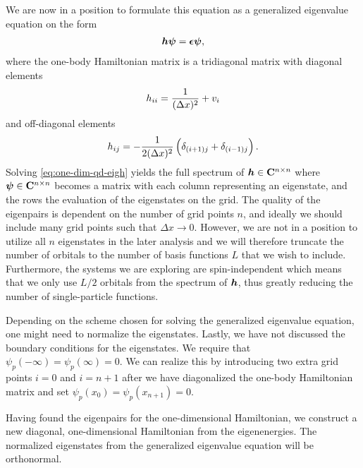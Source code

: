         We are now in a position to formulate this equation as a generalized
        eigenvalue equation on the form
        \begin{align}
            \boldsymbol{h}\boldsymbol{\psi}
            = \boldsymbol{\epsilon}\boldsymbol{\psi},
            \label{eq:one-dim-qd-eigh}
        \end{align}
        where the one-body Hamiltonian matrix is a tridiagonal matrix with
        diagonal elements
        \begin{align}
            h_{ii}
            =
            \frac{1}{(\Delta x)^2}
            + v_i
        \end{align}
        and off-diagonal elements
        \begin{align}
            h_{ij}
            = -\frac{1}{2(\Delta x)^2}\left( 
                \delta_{(i + 1) j}
                + \delta_{(i - 1) j}
             \right).
        \end{align}
        Solving \autoref{eq:one-dim-qd-eigh} yields the full spectrum of
        $\boldsymbol{h} \in \mathbf{C}^{n \times n}$ where $\boldsymbol{\psi} \in
        \mathbf{C}^{n \times n}$ becomes a matrix with each column representing
        an eigenstate, and the rows the evaluation of the eigenstates on the
        grid.
        The quality of the eigenpairs is dependent on the number of grid points
        $n$, and ideally we should include many grid points such that $\Delta x
        \to 0$.
        However, we are not in a position to utilize all $n$ eigenstates in the
        later analysis and we will therefore truncate the number of orbitals to
        the number of basis functions $L$ that we wish to include.
        Furthermore, the systems we are exploring are spin-independent which
        means that we only use $L / 2$ orbitals from the spectrum of $\boldsymbol{h}$,
        thus greatly reducing the number of single-particle functions.

        Depending on the scheme chosen for solving the generalized eigenvalue
        equation, one might need to normalize the eigenstates.
        Lastly, we have not discussed the boundary conditions for the
        eigenstates.
        We require that $\psi_p(-\infty) = \psi_p(\infty) = 0$.
        We can realize this by introducing two extra grid points $i = 0$ and $i
        = n + 1$ after we have diagonalized the one-body Hamiltonian matrix and
        set $\psi_p(x_0) = \psi_p(x_{n + 1}) = 0$.

        Having found the eigenpairs for the one-dimensional Hamiltonian, we
        construct a new diagonal, one-dimensional Hamiltonian from the
        eigenenergies.
        The normalized eigenstates from the generalized eigenvalue equation will
        be orthonormal.


